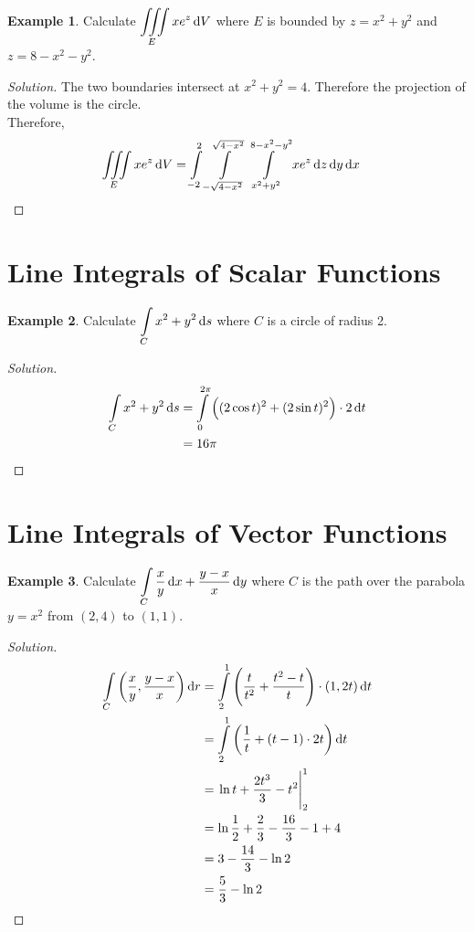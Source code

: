 \documentclass[fleqn, 12pt]{article}
\theoremstyle{definition}
\newtheorem{example}{Example}
\theoremstyle{theorem}
\newenvironment{solution}
{\begin{proof}[Solution]\let\qed\relax}
	{\end{proof}}
\begin{document}
\begin{example}
	Calculate $\displaystyle \iiint\limits_{E} x e^z \dif V$ where $E$ is bounded by $z = x^2 + y^2$ and $z = 8 - x^2 - y^2$.
\end{example}

\begin{solution}
	The two boundaries intersect at $x^2 + y^2 = 4$. Therefore the projection of the volume is the circle.\\
	Therefore,
	\begin{align*}
		\iiint\limits_{E} x e^z \dif V &= \int\limits_{-2}^{2} \int\limits_{-\sqrt{4 - x^2}}^{\sqrt{4 - x^2}} \int\limits_{x^2 + y^2}^{8 - x^2 - y^2} x e^z \dif z \dif y \dif x
	\end{align*}
\end{solution}

\section{Line Integrals of Scalar Functions}

\begin{example}
	Calculate $\displaystyle \int\limits_{C} x^2 + y^2 \dif s$ where $C$ is a circle of radius 2.
\end{example}

\begin{solution}
	\begin{align*}
		\int\limits_{C} x^2 + y^2 \dif s &= \int\limits_{0}^{2 \pi} \left( (2 \cos t)^2 + (2 \sin t)^2 \right) \cdot 2 \dif t\\
		&= 16 \pi
	\end{align*}
\end{solution}

\section{Line Integrals of Vector Functions}

\begin{example}
	Calculate $\displaystyle \int\limits_{C} \dfrac{x}{y} \dif x + \dfrac{y - x}{x} \dif y$ where $C$ is the path over the parabola $y = x^2$ from $(2,4)$ to $(1,1)$.
\end{example}

\begin{solution}
	\begin{align*}
		\int\limits_{C} \left( \dfrac{x}{y}, \dfrac{y - x}{x} \right) \dif r &= \int\limits_{2}^{1} \left( \dfrac{t}{t^2} + \dfrac{t^2 - t}{t} \right) \cdot (1, 2t) \dif t\\
		&= \int\limits_{2}^{1} \left( \dfrac{1}{t} + (t - 1) \cdot 2t \right) \dif t\\
		&= \left. \ln t + \dfrac{2 t^3}{3} - t^2 \right|_{2}^{1}\\
		&= \ln \dfrac{1}{2} + \dfrac{2}{3} - \dfrac{16}{3} - 1 + 4\\
		&= 3 - \dfrac{14}{3} - \ln 2\\
		&= \dfrac{5}{3} - \ln 2
	\end{align*}
\end{solution}
\end{document}
